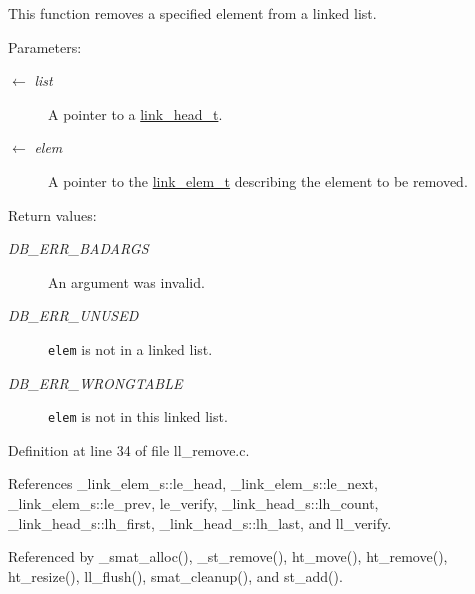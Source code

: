This function removes a specified element from a linked list.

\begin{Desc}
\item[Parameters:]
\begin{description}
\item[\mbox{$\leftarrow$} {\em list}]A pointer to a \hyperlink{group__dbprim__link_ga0}{link\_\-head\_\-t}. \item[\mbox{$\leftarrow$} {\em elem}]A pointer to the \hyperlink{group__dbprim__link_ga1}{link\_\-elem\_\-t} describing the element to be removed.\end{description}
\end{Desc}
\begin{Desc}
\item[Return values:]
\begin{description}
\item[{\em DB\_\-ERR\_\-BADARGS}]An argument was invalid. \item[{\em DB\_\-ERR\_\-UNUSED}]{\tt elem} is not in a linked list. \item[{\em DB\_\-ERR\_\-WRONGTABLE}]{\tt elem} is not in this linked list.\end{description}
\end{Desc}


Definition at line 34 of file ll\_\-remove.c.

References \_\-link\_\-elem\_\-s::le\_\-head, \_\-link\_\-elem\_\-s::le\_\-next, \_\-link\_\-elem\_\-s::le\_\-prev, le\_\-verify, \_\-link\_\-head\_\-s::lh\_\-count, \_\-link\_\-head\_\-s::lh\_\-first, \_\-link\_\-head\_\-s::lh\_\-last, and ll\_\-verify.

Referenced by \_\-smat\_\-alloc(), \_\-st\_\-remove(), ht\_\-move(), ht\_\-remove(), ht\_\-resize(), ll\_\-flush(), smat\_\-cleanup(), and st\_\-add().